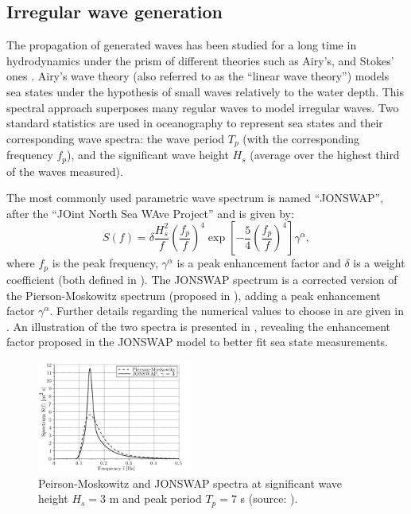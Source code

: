 \subsection{Irregular wave generation}\label{sec:waves}

The propagation of generated waves has been studied for a long time in hydrodynamics under the prism of different theories such as Airy's, and Stokes' ones \citep{goda_2010_waves}. 
Airy's wave theory (also referred to as the ``linear wave theory'') models sea states under the hypothesis of small waves relatively to the water depth.  
This spectral approach superposes many regular waves to model irregular waves. 
Two standard statistics are used in oceanography to represent sea states and their corresponding wave spectra: 
the wave period $T_p$ (with the corresponding frequency $f_p$), and the significant wave height $H_s$ (average over the highest third of the waves measured). 

The most commonly used parametric wave spectrum is named ``JONSWAP'', after the ``JOint North Sea WAve Project'' \citep{jonswap_1973} and is given by: 
\begin{equation}
    S(f) = \delta \frac{H_s^2}{f} \left(\frac{f_p}{f}\right)^4 \exp\left[-\frac54 \left(\frac{f_p}{f}\right)^4 \right] \gamma^\alpha,
    \label{eq:jonswap}
\end{equation}
where $f_p$ is the peak frequency, $\gamma^\alpha$ is a peak enhancement factor and $\delta$ is a weight coefficient (both defined in \citealp{milano_thesis_2021}). 
The JONSWAP spectrum is a corrected version of the Pierson-Moskowitz spectrum (proposed in \citealp{pierson_1964}), adding a peak enhancement factor $\gamma^\alpha$. 
Further details regarding the numerical values to choose in  are given in \citet{burton_2021_wind_handbook}. 
An illustration of the two spectra is presented in , revealing the enhancement factor proposed in the JONSWAP model to better fit sea state measurements. 

\begin{figure}%
    \centering
    \includegraphics[width=0.45\textwidth]{./part1/figures/jonswap.png}
    \caption{Peirson-Moskowitz and JONSWAP spectra at significant wave height $H_s = 3$
    m and peak period $T_p = 7$ s (source: \citealp{milano_thesis_2021}).}
    \label{fig:jonswap}
\end{figure}


